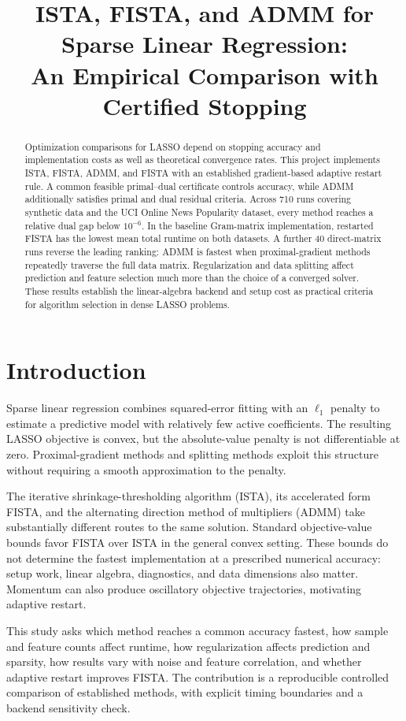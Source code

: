 \documentclass{article}
\title{ISTA, FISTA, and ADMM for Sparse Linear Regression:\\An Empirical Comparison with Certified Stopping}
\author{}
\begin{document}
\maketitle
\begin{abstract}
Optimization comparisons for LASSO depend on stopping accuracy and implementation costs as well as theoretical convergence rates. This project implements ISTA, FISTA, ADMM, and FISTA with an established gradient-based adaptive restart rule. A common feasible primal--dual certificate controls accuracy, while ADMM additionally satisfies primal and dual residual criteria. Across 710 runs covering synthetic data and the UCI Online News Popularity dataset, every method reaches a relative dual gap below $10^{-6}$. In the baseline Gram-matrix implementation, restarted FISTA has the lowest mean total runtime on both datasets. A further 40 direct-matrix runs reverse the leading ranking: ADMM is fastest when proximal-gradient methods repeatedly traverse the full data matrix. Regularization and data splitting affect prediction and feature selection much more than the choice of a converged solver. These results establish the linear-algebra backend and setup cost as practical criteria for algorithm selection in dense LASSO problems.
\end{abstract}

\section{Introduction}
Sparse linear regression combines squared-error fitting with an $\ell_1$ penalty to estimate a predictive model with relatively few active coefficients. The resulting LASSO objective is convex, but the absolute-value penalty is not differentiable at zero. Proximal-gradient methods and splitting methods exploit this structure without requiring a smooth approximation to the penalty.

The iterative shrinkage-thresholding algorithm (ISTA), its accelerated form FISTA, and the alternating direction method of multipliers (ADMM) take substantially different routes to the same solution. Standard objective-value bounds favor FISTA over ISTA in the general convex setting. These bounds do not determine the fastest implementation at a prescribed numerical accuracy: setup work, linear algebra, diagnostics, and data dimensions also matter. Momentum can also produce oscillatory objective trajectories, motivating adaptive restart.

This study asks which method reaches a common accuracy fastest, how sample and feature counts affect runtime, how regularization affects prediction and sparsity, how results vary with noise and feature correlation, and whether adaptive restart improves FISTA. The contribution is a reproducible controlled comparison of established methods, with explicit timing boundaries and a backend sensitivity check.
\end{document}
